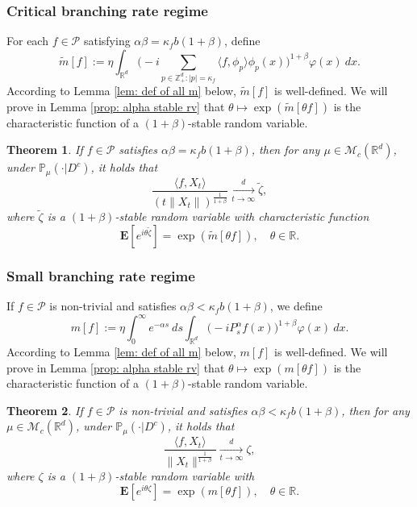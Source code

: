\documentclass[12pt,a4paper]{amsart}
\theoremstyle{plain}
\newtheorem{thm}{Theorem}[section]
\theoremstyle{definition}
\numberwithin{equation}{section}
\begin{document}
\subsubsection{Critical branching rate regime}
    For each $f\in \mathcal{P}$ satisfying $\alpha\beta=\kappa_f b(1+\beta)$, define
\begin{equation}\label{tilde-m}
    \widetilde{m}[f]
        := \eta\int_{\mathbb R^d} \Big(-i\sum_{p\in \mathbb Z_+^d:|p|=\kappa_f}\langle f,\phi_p\rangle\phi_p(x)\Big)^{1+\beta} \varphi(x)~dx.
\end{equation}
    According to Lemma \ref{lem: def of all m} below, $\widetilde m[f]$ is well-defined.
   We will prove in Lemma \ref{prop: alpha stable rv} that
   $\theta \mapsto \exp( \widetilde m[\theta f])$ is the characteristic function of a $(1+\beta)$-stable random variable.
\begin{thm}
\label{thm: critical clt}
    If $f\in\mathcal{P}$ satisfies  $\alpha\beta=\kappa_fb(1+\beta)$, then for any $\mu\in \mathcal M_c(\mathbb R^d)$,
    under $\mathbb{P}_{\mu}(\cdot|D^c)$,
    it holds that
\[
    \frac{\langle f,X_t\rangle}{\left(t\|X_t\|\right)^{\frac{1}{1+\beta}}}
        \xrightarrow[t\to \infty]{d} \widetilde{\zeta},
\]
    where $\widetilde{\zeta}$ is a $(1+\beta)$-stable random variable with
    characteristic function
\[
     \mathbf E [e^{i\theta \widetilde{\zeta}}]
    =\exp(\widetilde{m}[\theta f]),
    \quad \theta\in \mathbb R.
\]
\end{thm}

\subsubsection{Small branching rate regime}
\label{msmallcase}
	If $f\in \mathcal{P}$ is non-trivial and satisfies  $\alpha\beta<\kappa_f b(1+\beta)$,
	we define
\begin{equation}
    m[f]
    :=\eta \int_0^{\infty} e^{-\alpha s} ~ds\int_{\mathbb R^d} \big(-iP_s^\alpha f(x)\big)^{1+\beta} \varphi(x)~dx.
\end{equation}
	According to Lemma \ref{lem: def of all m} below, $m[f]$ is well-defined.
	We will prove  in Lemma \ref{prop: alpha stable rv} that $\theta \mapsto \exp( m[\theta f])$ is the characteristic function of a $(1+\beta)$-stable random variable.
\begin{thm}
\label{thm: small clt}
       If $f\in\mathcal{P}$ is non-trivial and satisfies $\alpha\beta<\kappa_f b(1+\beta)$,
    then for any $\mu\in \mathcal M_c(\mathbb R^d)$, under $\mathbb{P}_{\mu}(\cdot|D^c)$, it holds that
\[
        \frac{\langle f,X_t\rangle}{\|X_t\|^{\frac{1}{1+\beta}}}\xrightarrow[t\rightarrow \infty]{d} \zeta,
\]
    where $\zeta$ is a $(1+\beta)$-stable random variable with
\[
       \mathbf E[e^{i\theta \zeta}]
    =\exp(m[\theta f]),
    \quad \theta\in \mathbb R.
\]
\end{thm}
\end{document}
